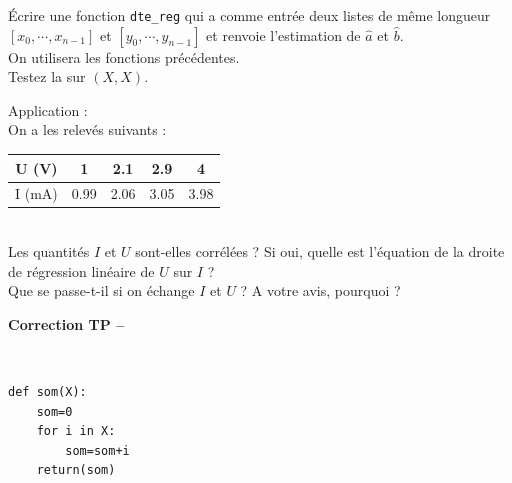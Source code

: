 \begin{exercice}
\' Ecrire une fonction \verb?dte_reg? qui a comme entr\' ee deux listes de m\^ eme longueur $[x_0,\cdots,x_{n-1}]$ et $[y_0,\cdots,y_{n-1}]$ et renvoie l'estimation de $\hat{a}$ et $\hat{b}$.\\
On utilisera les fonctions pr\' ec\' edentes.\\
Testez la sur $(X,X)$.
\end{exercice}


\begin{exercice}
Application : \\
On a les relev\' es suivants :
\begin{tabular}{|c|cccc|}
\hline
U (V) & 1&2.1&2.9&4\\ \hline
I (mA)&0.99&2.06&3.05&3.98\\\hline
\end{tabular}\\
Les quantit\' es $I$ et $U$ sont-elles corr\' el\' ees ? Si oui, quelle est l'\' equation de la droite de r\' egression lin\' eaire de $U$ sur $I$ ?\\
Que se passe-t-il si on \' echange $I$ et $U$ ? A votre avis, pourquoi ?
\end{exercice}






\ifdef{\public}{}{}

\newpage 

\begin{center}
{\Large\bf Correction TP \no {\num} -- \descrip}
\end{center}



\begin{solution}~\\
\vspace*{-0.7cm}
 \begin{verbatim}
def som(X):
    som=0
    for i in X:
        som=som+i
    return(som)    
\end{verbatim}
\end{solution}


